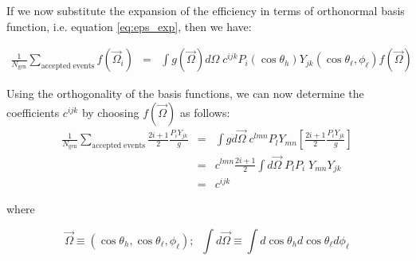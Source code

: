 \documentclass[a4paper,10pt,twosided]{article}
\begin{document}
If we now substitute the expansion of the efficiency in terms of orthonormal basis function,
i.e. equation \ref{eq:eps_exp}, then we have:

\begin{eqnarray*}
  \frac{1}{N_{\mathrm{gen}}} \sum_{\mathrm{accepted\; events}} f(\vec{\Omega}_i) 
    &=& \int g(\vec{\Omega})d\Omega\;  c^{ijk} P_i(\cos\theta_h)Y_{jk}(\cos\theta_\ell,\phi_\ell)  f(\vec{\Omega})
\end{eqnarray*}

Using the orthogonality of the basis functions, we can now determine the coefficients $c^{ijk}$ 
by  choosing $f(\vec{\Omega})$ as follows:
\begin{eqnarray*}
\frac{1}{N_{\mathrm{gen}}} \sum_{\mathrm{accepted \;events}} \frac{2i+1}{2}\frac{ P_i Y_{jk} }{ g }  &=&
    \int g d\vec{\Omega}\; c^{lmn} P_lY_{mn} \left[  \frac{2i+1}{2}\frac{ P_iY_{jk} }{ g } \right] 
\\  &=& c^{lmn} \frac{2i+1}{2} \int d\vec{\Omega}\; P_l P_i \; Y_{mn} Y_{jk}
\\  &=& c^{ijk}
\end{eqnarray*}

where

\begin{equation*}
\vec{\Omega} \equiv (\cos\theta_h,\cos\theta_\ell,\phi_\ell);\;\; \int d\vec{\Omega} \equiv \int d\cos\theta_h d\cos\theta_\ell d\phi_\ell
\end{equation*}
\end{document}
